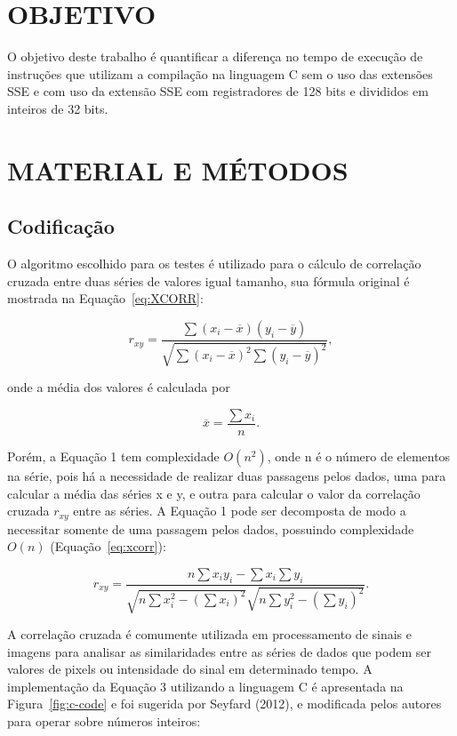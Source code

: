 \documentclass[a4paper]{article}
\begin{document}
\section*{OBJETIVO}
O objetivo deste trabalho é quantificar a diferença no tempo de
execução de instruções que utilizam a compilação na linguagem C sem o
uso das extensões SSE e com uso da extensão SSE com registradores de
128 bits e divididos em inteiros de 32 bits.

\section*{MATERIAL E MÉTODOS}

\subsection*{Codificação}

O algoritmo escolhido para os testes é utilizado para o cálculo de
correlação cruzada entre duas séries de valores igual tamanho, sua
fórmula original é mostrada na Equação~\ref{eq:XCORR}:

 \begin{equation}
     r_{xy}= \frac{ \sum (x_i-\overline{x})(y_i- \overline{y}) }{
  \sqrt{\sum (x_i-\overline{x})^2 \sum (y_i-\overline{y})^2}},
   \label{eq:XCORR}
 \end{equation}


\noindent onde a média dos valores é calculada por

\begin{equation}
\overline{x} = \frac{\sum{x_i}}{n}.
  \label{eq:mean}
\end{equation}

Porém, a Equação 1 tem complexidade $O(n^2)$, onde n é o número de
elementos na série, pois há a necessidade de realizar duas passagens
pelos dados, uma para calcular a média das séries x e y, e outra para
calcular o valor da correlação cruzada $r_{xy}$ entre as séries. A Equação
1 pode ser decomposta de modo a necessitar somente de uma passagem
pelos dados, possuindo complexidade $O(n)$ (Equação~\ref{eq:xcorr}):

\begin{equation}
r_{xy} = \frac{ n\sum x_iy_i-\sum x_i\sum y_i } { \sqrt{n\sum
    x_i^2-(\sum x_i)^2} \sqrt{n\sum y_i^2-(\sum y_i)^2} }.
  \label{eq:xcorr}
\end{equation}

A correlação cruzada é comumente utilizada em processamento de sinais
e imagens para analisar as similaridades entre as séries de dados que
podem ser valores de pixels ou intensidade do sinal em determinado
tempo.  A implementação da Equação 3 utilizando a linguagem C é
apresentada na Figura~\ref{fig:c-code} e foi sugerida por Seyfard (2012), e
modificada pelos autores para operar sobre números inteiros:
\end{document}
